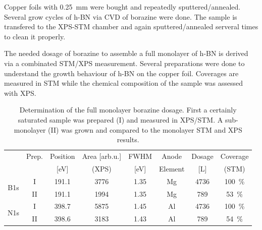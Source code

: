 Copper foils with \SI{0.25}{\mm} were bought and repeatedly sputtered/annealed. Several grow cycles of h-BN via CVD of borazine were done.  The sample is transfered to the XPS-STM chamber and again sputtered/annealed serveral times to clean it properly.

The needed dosage of borazine to assemble a full monolayer of h-BN is derived via a combinated STM/XPS measurement. Several preparations were done to understand the growth behaviour of h-BN on the copper foil. Coverages are measured in STM while the chemical composition of the sample was assessed with XPS.
\begin{table}[h!]
\centering
\caption{Determination of the full monolayer borazine dosage. First a certainly saturated sample was prepared (I) and measured in XPS/STM. A sub-monolayer (II) was grown and compared to the monolayer STM and XPS results.}
 \begin{tabular}{cccccccc}
  & Prep. & Position    & Area [arb.u.] & FWHM  & Anode & Dosage  & Coverage\\ 
  &	  &	[eV]	& (XPS)		&[eV]	&Element&[L]	  & (STM) \\ \hline \hline
  \multirow{2}{*}{B1s} 	&I& 191.1 & 3776 & 1.35 & Mg & 4736 & \SI{100}{\percent}\\
    			&II& 191.1 & 1994 & 1.35 & Mg & 789 &\SI{53}{\percent}\\ \hline
  \multirow{2}{*}{N1s} 	&I& 398.7 & 5875 & 1.45 & Al  & 4736 & \SI{100}{\percent}\\
 			&II& 398.6 & 3183 & 1.43 & Al & 789 &\SI{54}{\percent}\\
 \end{tabular}
\end{table}

